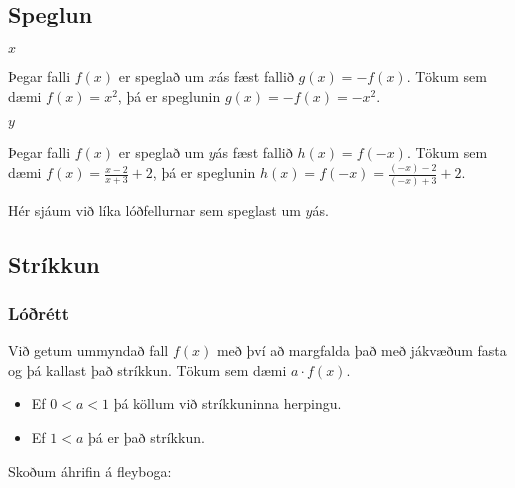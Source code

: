 \documentclass[a4paper,10pt,icelandic]{sphinxmanual}
\begin{document}
\subsection{Speglun}
\label{\detokenize{Kafli09:speglun}}
 \(x\) 

Þegar falli \(f(x)\) er speglað um \(x\)\sphinxhyphen{}ás fæst fallið \(g(x) = -f(x)\). Tökum sem dæmi \(f(x)=x^2\), þá er speglunin \(g(x) = -f(x) = -x^2\).


 \(y\) 

Þegar falli \(f(x)\) er speglað um \(y\)\sphinxhyphen{}ás fæst fallið \(h(x) = f(-x)\).
Tökum sem dæmi \(f(x)=\frac{x-2}{x+3}+2\), þá er speglunin \(h(x) = f(-x) = \frac{(-x)-2}{(-x)+3}+2\).


Hér sjáum við líka lóðfellurnar sem speglast um \(y\)\sphinxhyphen{}ás.


\subsection{Stríkkun}
\label{\detokenize{Kafli09:strikkun}}

\subsubsection{Lóðrétt}
\label{\detokenize{Kafli09:lorett}}
Við getum ummyndað fall \(f(x)\) með því að margfalda það með jákvæðum fasta og þá kallast það stríkkun. Tökum sem dæmi \(a \cdot f(x)\).
\begin{itemize}
\item {} 
Ef \(0<a<1\) þá köllum við stríkkuninna herpingu.

\item {} 
Ef \(1<a\) þá er það stríkkun.

\end{itemize}

Skoðum áhrifin á fleyboga:

\end{document}
